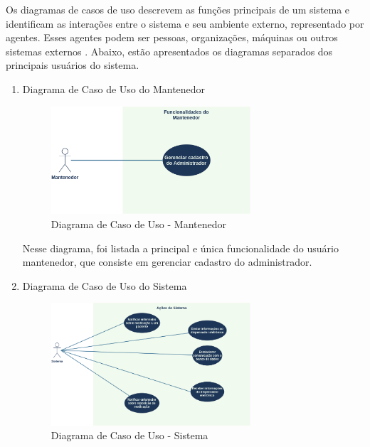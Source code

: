 Os diagramas de casos de uso descrevem as funções principais de um sistema e identificam as interações entre o sistema e seu ambiente externo, representado por agentes. Esses agentes podem ser pessoas, organizações, máquinas ou outros sistemas externos \cite{IBM}. Abaixo, estão apresentados os diagramas separados dos principais usuários do sistema.

\begin{enumerate}
    \item Diagrama de Caso de Uso do Mantenedor
    
\begin{figure}[H]
    \centering
    \includegraphics[width=0.7\textwidth]{figuras/software/UML/matenedor-us.png}
    \caption{Diagrama de Caso de Uso - Mantenedor}
    \label{fig:mantenedor_us}
\end{figure}

Nesse diagrama, foi listada a principal e única funcionalidade do usuário mantenedor, que consiste em gerenciar cadastro do administrador.

\newpage

    \item Diagrama de Caso de Uso do Sistema
    
\begin{figure}[H]
    \centering
    \includegraphics[width=0.7\textwidth]{figuras/software/UML/sistema-us.png}
    \caption{Diagrama de Caso de Uso - Sistema}
    \label{fig:sistema_us}
\end{figure}


\end{enumerate}
